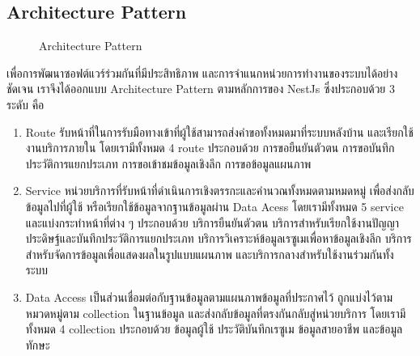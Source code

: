 \subsection{Architecture Pattern}
\begin{figure}[H]\centering
    \setlength{\fboxrule}{0.2mm} %
    \setlength{\fboxsep}{0.5cm}
    \caption{Architecture Pattern}\label{fig:arch_pattern}
\end{figure}
เพื่อการพัฒนาซอฟต์แวร์ร่วมกันที่มีประสิทธิภาพ และการจำแนกหน่วยการทำงานของระบบได้อย่างชัดเจน เราจึงได้ออกแบบ Architecture Pattern ตามหลักการของ NestJs ซึ่งประกอบด้วย 3 ระดับ คือ

\begin{enumerate}
    \item Route รับหน้าที่ในการรับมือทางเข้าที่ผู้ใช้สามารถส่งคำขอทั้งหมดมาที่ระบบหลังบ้าน และเรียกใช้งานบริการภายใน โดยเรามีทั้งหมด 4 route ประกอบด้วย การขอยืนยันตัวตน การขอบันทึกประวัติการแยกประเภท การขอเข้าชมข้อมูลเชิงลึก การขอข้อมูลแผนภาพ
    \item Service หน่วยบริการที่รับหน้าที่ดำเนินการเชิงตรรกะและคำนวณทั้งหมดตามหมดหมู่ เพื่อส่งกลับข้อมูลไปที่ผู้ใช้ หรือเรียกใช้ข้อมูลจากฐานข้อมูลผ่าน Data Acess โดยเรามีทั้งหมด 5 service และแบ่งกระทำหน้าที่ต่าง ๆ ประกอบด้วย บริการยืนยันตัวตน บริการสำหรับเรียกใช้งานปัญญาประดิษฐ์และบันทึกประวัติการแยกประเภท บริการวิเคราะห์ข้อมูลเรซูเมเพื่อหาข้อมูลเชิงลึก บริการสำหรับจัดการข้อมูลเพื่อแสดงผลในรูปแบบแผนภาพ และบริการกลางสำหรับใช้งานร่วมกันทั้งระบบ
    \item Data Access เป็นส่วนเชื่อมต่อกับฐานข้อมูลตามแผนภาพข้อมูลที่ประกาศไว้ ถูกแบ่งไว้ตามหมวดหมู่ตาม collection ในฐานข้อมูล และส่งกลับข้อมูลที่ตรงกันกลับสู่หน่วยบริการ โดยเรามีทั้งหมด 4 collection ประกอบด้วย ข้อมูลผู้ใช้ ประวัติบันทึกเรซูเม ข้อมูลสายอาชีพ และข้อมูลทักษะ
\end{enumerate}



